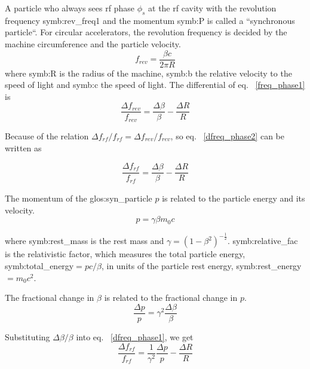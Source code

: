 A particle who always sees rf phase $\phi_\mathit{s}$ at the rf cavity with the revolution frequency \gls{symb:rev_freq1} and the momentum \gls{symb:P} is called a ``synchronous particle``. For circular accelerators, the revolution frequency is decided by the machine circumference and the particle velocity.
\begin{equation}
f_{\mathit{rev}}=\frac{\beta c}{2\pi R} \label{freq_phase1}
\end{equation}
where \gls{symb:R} is the radius of the machine, \gls{symb:b} the relative velocity to the speed of light and \gls{symb:c} the speed of light. The differential of eq. ~\ref{freq_phase1} is
\begin{equation}
\frac{\Delta f_{\mathit{rev}}}{f_{\mathit{rev}}}=\frac{\Delta\beta}{\beta}-\frac{\Delta R}{R} \label{dfreq_phase2}
\end{equation}

Because of the relation $\Delta f_{\mathit{rf}}/f_{\mathit{rf}}=\Delta f_{\mathit{rev}}/f_{\mathit{rev}}$, so eq.~ \ref{dfreq_phase2} can be written as

\begin{equation}
\frac{\Delta f_{\mathit{rf}}}{f_{\mathit{rf}}}=\frac{\Delta\beta}{\beta}-\frac{\Delta R}{R} \label{dfreq_phase1}
\end{equation}

The momentum of the \gls{glos:syn_particle} $p$ is related to the particle energy and its velocity.  
\begin{equation}
p=\gamma \beta m_0c
\end{equation}

where \gls{symb:rest_mass} is the rest mass and $\gamma=(1-\beta^2)^{-\frac{1}{2}}$. \gls{symb:relative_fac} is the relativistic factor, which measures the total particle energy, \gls{symb:total_energy}$=pc/\beta$, in units of the particle rest energy, \gls{symb:rest_energy}$=m_0c^2$. 


The fractional change in $\beta$ is related to the fractional change in $p$.
\begin{equation}
\label{eq:pv}
\frac{\Delta p}{p}=\gamma^2\frac{\Delta \beta}{\beta}
\end{equation}

Substituting $\Delta \beta/\beta$ into eq. ~\ref{dfreq_phase1}, we get 
\begin{equation}
\frac{\Delta f_{\mathit{rf}}}{f_{\mathit{rf}}}=\frac{1}{\gamma^2}\frac{\Delta p}{p}-\frac{\Delta R}{R}\label{f_p_r1}
\end{equation} 

